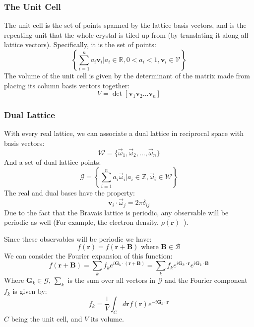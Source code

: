 \documentclass[12pt]{article}
\begin{document}
\subsubsection{The Unit Cell}
The unit cell is the set of points spanned by the lattice basis vectors, and is the repeating unit that the whole crystal is tiled up from (by translating it along all lattice vectors). Specifically, it is the set of points:
\begin{equation}\label{eq:unit_cell}
	\left\{\sum _{i=1}^n a_i \mathbf v_i \Big| a_i \in \mathbb{R}, 0<a_i<1, \mathbf{v}_i \in \mathcal V \right\}
\end{equation}
The volume of the unit cell is given by the determinant of the matrix made from placing its column basis vectors together:
\begin{equation}
	V = \det [\mathbf{v}_1 \mathbf{v}_2 ... \mathbf{v}_n]
\end{equation}
\subsubsection{Dual Lattice}
With every real lattice, we can associate a dual lattice in reciprocal space with basis vectors:
\begin{equation}\label{eq:dual_basis}
	\mathcal{W} = \{\vec{\omega}_1, \vec \omega _2, ..., \vec{\omega}_n\}
\end{equation}
And a set of dual lattice points:
\begin{equation}\label{eq:dual_lattice}
	\mathcal{G} = \left \{\sum_{i=1}^n a_i\vec{\omega}_i \Big | a_i \in \mathbb{Z}, \vec{\omega}_i \in \mathcal{W}  \right \}
\end{equation}
The real and dual bases have the property:
\begin{equation}
	\mathbf v _ i \cdot \vec\omega_j = 2\pi\delta_{ij}
\end{equation}
Due to the fact that the Bravais lattice is periodic, any observable will be periodic as well (For example, the electron density, $\rho(\mathbf{r})$\ ).

Since these observables will be periodic we have:
\begin{equation}\label{eq:periodic_observable}
	f(\mathbf r) = f(\mathbf r + \mathbf B) \text{ where } \mathbf B \in \mathcal B
\end{equation}
We can consider the Fourier expansion of this function:
\begin{equation}\label{eq:f_fourier_expansion}
	f(\mathbf r + \mathbf B) = \sum_k f_k e ^ {i \mathbf G_k\cdot(\mathbf r + \mathbf B)} 
	= \sum _k f_k e ^ {i \mathbf G_k \cdot \mathbf r} e ^ {i \mathbf G_k \cdot \mathbf B}
\end{equation}
Where $\mathbf G_k \in \mathcal G$, $\sum_k$ is the sum over all vectors in $\mathcal G$ and the Fourier component $f_k$ is given by:
\begin{equation}
	f_k = \frac{1}{V}\int_Cd\mathbf rf(\mathbf r)e^{-i\mathbf G_k\cdot \mathbf r}
\end{equation}
$C$ being the unit cell, and $V$ its volume.
\end{document}
